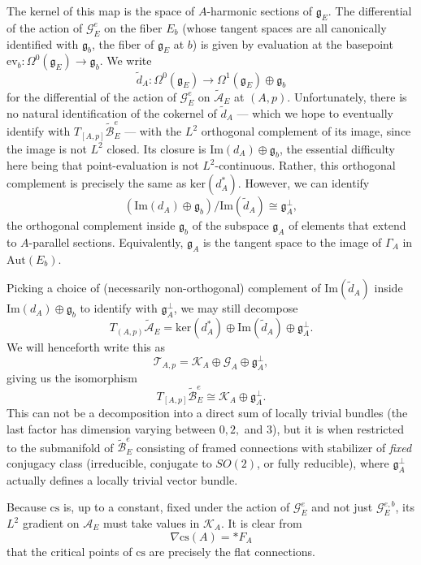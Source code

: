 \documentclass[10pt,a4paper]{amsart}
\theoremstyle{definition}
\theoremstyle{remark}
\numberwithin{figure}{qchap}
\begin{document}
The kernel of this map is the space of $A$-harmonic sections of $\mathfrak g_E$. The differential of the action of $\mathcal G^e_E$ on the fiber $E_b$ (whose tangent spaces are all canonically identified with $\mathfrak g_b$, the fiber of $\mathfrak g_E$ at $b$) is given by evaluation at the basepoint $\text{ev}_b: \Omega^0(\mathfrak g_E) \to \mathfrak g_b$. We write 
$$\tilde d_A: \Omega^0(\mathfrak g_E) \to \Omega^1(\mathfrak g_E) \oplus \mathfrak g_b$$ 
for the differential of the action of $\mathcal G^e_E$ on $\widetilde{\mathcal A}_E$ at $(A,p)$. Unfortunately, there is no natural identification of the cokernel of $\tilde d_A$ --- which we hope to eventually identify with $T_{[A,p]} \widetilde{\mathcal B}^e_E$ --- with the $L^2$ orthogonal complement of its image, since the image is not $L^2$ closed. Its closure is $\text{Im}(d_A) \oplus \mathfrak g_b$, the essential difficulty here being that point-evaluation is not $L^2$-continuous. Rather, this orthogonal complement is precisely the same as $\text{ker}(d_A^*)$. However, we can identify $$(\text{Im}(d_A) \oplus \mathfrak g_b)/\text{Im}(\tilde d_A) \cong \mathfrak g_A^\perp,$$ the orthogonal complement inside $\mathfrak g_b$ of the subspace $\mathfrak g_A$ of elements that extend to $A$-parallel sections. Equivalently, $\mathfrak g_A$ is the tangent space to the image of $\Gamma_A$ in $\text{Aut}(E_b)$. 

Picking a choice of (necessarily non-orthogonal) complement of $\text{Im}(\tilde d_A)$ inside $\text{Im}(d_A) \oplus \mathfrak g_b$ to identify with $\mathfrak g_A^\perp$, we may still decompose 
$$T_{(A,p)} \widetilde{\mathcal A}_E = \text{ker}(d_A^*) \oplus \text{Im}(\tilde d_A) \oplus \mathfrak g_A^\perp.$$ 
We will henceforth write this as 
$$\mathcal T_{A,p} = \mathcal K_A \oplus \mathcal G_A \oplus \mathfrak g_A^\perp,$$ 
giving us the isomorphism 
$$T_{[A,p]}\widetilde{\mathcal B}^e_E \cong \mathcal K_A \oplus \mathfrak g_A^\perp.$$ 
This can not be a decomposition into a direct sum of locally trivial bundles (the last factor has dimension varying between $0, 2,$ and $3$), but it is when restricted to the submanifold of $\widetilde{\mathcal B}^e_E$ consisting of framed connections with stabilizer of \emph{fixed} conjugacy class (irreducible, conjugate to $SO(2)$, or fully reducible), where $\mathfrak g_A^\perp$ actually defines a locally trivial vector bundle.

Because $\text{cs}$ is, up to a constant, fixed under the action of $\mathcal G^e_E$ and not just $\mathcal G^{e,b}_E$, its $L^2$ gradient on $\mathcal A_E$ must take values in $\mathcal K_A$. It is clear from $$\nabla \text{cs}(A) = *F_A$$ that the critical points of $\text{cs}$ are precisely the flat connections.
\end{document}
